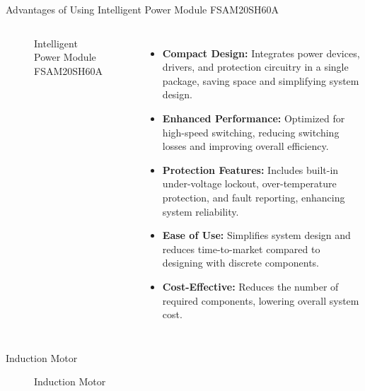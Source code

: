\begin{frame}{Advantages of Using Intelligent Power Module FSAM20SH60A}
	\begin{columns}
		\begin{figure}
			\centering
			\caption{Intelligent Power Module FSAM20SH60A}
		\end{figure}
		\begin{itemize}
			\item \textbf{Compact Design:} Integrates power devices, drivers, and protection circuitry in a single package, saving space and simplifying system design.
			\item \textbf{Enhanced Performance:} Optimized for high-speed switching, reducing switching losses and improving overall efficiency.
			\item \textbf{Protection Features:} Includes built-in under-voltage lockout, over-temperature protection, and fault reporting, enhancing system reliability.
			\item \textbf{Ease of Use:} Simplifies system design and reduces time-to-market compared to designing with discrete components.
			\item \textbf{Cost-Effective:} Reduces the number of required components, lowering overall system cost.
		\end{itemize}
	\end{columns}
\end{frame}

\begin{frame}{Induction Motor}
	\begin{figure}
		\centering


		\caption{Induction Motor}

	\end{figure}
\end{frame}

